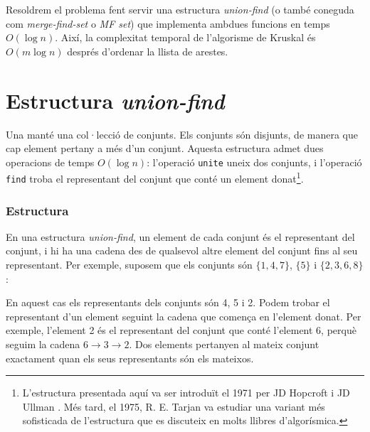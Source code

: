 Resoldrem el problema fent servir una estructura \emph{union-find} (o
també coneguda com \emph{merge-find-set} o \emph{MF set}) que
implementa ambdues funcions en temps $O(\log n)$. Així, la complexitat
temporal de l'algorisme de Kruskal és $O(m \log n)$ després d'ordenar
la llista de arestes.

\section{Estructura \emph{union-find}}
\label{union-find}


Una  manté una col·lecció de
conjunts. Els conjunts són disjunts, de manera que cap element pertany
a més d'un conjunt. Aquesta estructura admet dues operacions de temps
$O(\log n)$: l'operació \texttt{unite} uneix dos conjunts, i
l'operació \texttt{find} troba el representant del conjunt que conté
un element donat\footnote{L'estructura presentada aquí va ser
introduït el 1971 per JD Hopcroft i JD Ullman \cite{hop71}. Més tard,
el 1975, R. E. Tarjan va estudiar una variant més sofisticada de
l'estructura \cite{tar75} que es discuteix en molts llibres
d'algorísmica.}.

\subsubsection{Estructura}

En una estructura \emph{union-find}, un element de cada conjunt és el
representant del conjunt, i hi ha una cadena des de qualsevol altre
element del conjunt fins al seu representant. Per exemple, suposem que
els conjunts són $\{1,4,7\}$, $\{5\}$ i $\{2,3,6,8\}$:
\begin{center}
\end{center}
En aquest cas els representants dels conjunts són 4, 5 i 2. Podem
trobar el representant d'un element seguint la cadena que
comença en l'element donat. Per exemple, l'element 2 és el representant del conjunt
que conté l'element 6, perquè seguim la cadena $6 \rightarrow 3 \rightarrow
2$. Dos elements pertanyen al mateix conjunt exactament quan els seus
representants són els mateixos.

